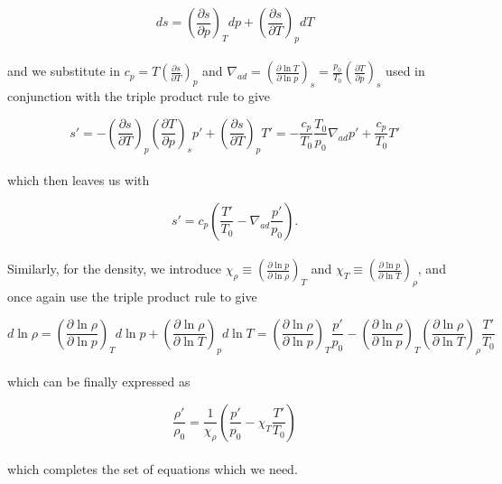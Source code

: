 \documentclass[11pt]{amsart}
\begin{document}
\begin{equation}
ds = \left( \frac{\partial s}{\partial p} \right)_{T} dp +\left( \frac{\partial s}{\partial T} \right)_{p} dT
\end{equation} 
\\
and we substitute in $c_{p} = T \left( \frac{\partial s}{\partial T} \right)_{p}$ and 
$\nabla_{ad} = \left( \frac{\partial \ln T}{\partial \ln p} \right)_{s} = \frac{p_{0}}{T_{0}} \left( \frac{\partial T}{\partial p} \right)_{s}$ used in conjunction with
the triple product rule to give

\begin{equation}
s' = - \left( \frac{\partial s}{\partial T} \right)_{p} \left( \frac{\partial T}{\partial p} \right)_{s} p' +\left( \frac{\partial s}{\partial T} \right)_{p} T'
= - \frac{c_{p}}{T_{0}} \frac{T_{0}}{p_{0}} \nabla_{ad} p' + \frac{c_{p}}{T_{0}} T'
\end{equation} 
\\
which then leaves us with

\begin{equation}
s' = c_{p} \left( \frac{T'}{T_{0}} - \nabla_{ad} \frac{p'}{p_{0}} \right).
\end{equation} 
\\
Similarly, for the density, we introduce $\chi_{\rho} \equiv \left( \frac{\partial \ln p}{\partial \ln \rho} \right)_{T}$
 and $\chi_{T} \equiv \left( \frac{\partial \ln p}{\partial \ln T} \right)_{\rho}$, and once again use the 
 triple product rule to give
 
\begin{equation}
d \ln \rho = \left( \frac{\partial \ln \rho}{\partial \ln p} \right)_{T} d \ln p + \left( \frac{\partial \ln \rho}{\partial \ln T} \right)_{p} d \ln T
= \left( \frac{\partial \ln \rho}{\partial \ln p} \right)_{T} \frac{p'}{p_{0}} - \left( \frac{\partial \ln \rho}{\partial \ln p} \right)_{T} \left( \frac{\partial \ln \rho}{\partial \ln T} \right)_{\rho} \frac{T'}{T_{0}}
\end{equation} 
\\
which can be finally expressed as

\begin{equation}
\frac{\rho'}{\rho_{0}}= \frac{1}{\chi_{\rho}} \left( \frac{p'}{p_{0}} - \chi_{T} \frac{T'}{T_{0}} \right)
\end{equation}
\\
which completes the set of equations which we need.
\end{document}
